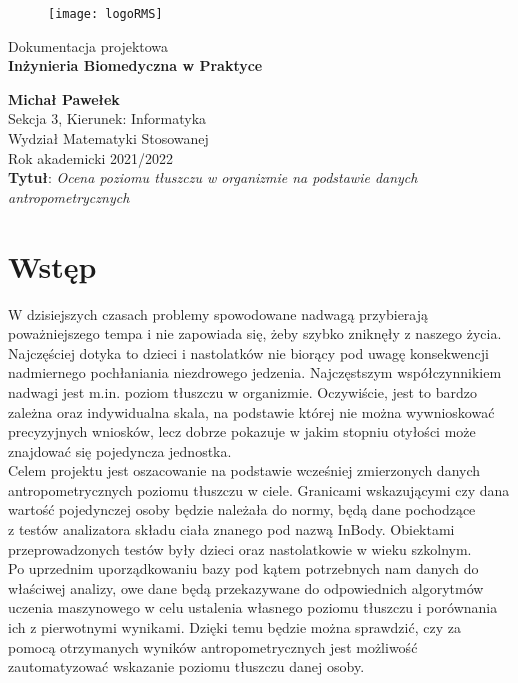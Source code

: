 \documentclass{article}
\begin{document}
\thispagestyle{empty}

\begin{figure}[htbp!]
\centering
\texttt{[image: logoRMS]} \\
\end{figure}
\vspace{1.2cm}

\begin{center}
\Large{Dokumentacja projektowa}\\\vspace{0.5cm} \LARGE{\textbf{Inżynieria Biomedyczna w Praktyce}} 

\vspace{2cm}
{
\large{\textbf{Michał Pawełek}
\\
Sekcja 3, Kierunek: Informatyka \\
Wydział Matematyki Stosowanej \\
Rok akademicki 2021/2022 }\\
\vspace{2.2cm}
\Large{\textbf{Tytuł}: \textit{Ocena poziomu tłuszczu w organizmie na podstawie danych antropometrycznych}}}
\end{center}


\newpage
\setcounter{page}{1}
	\tableofcontents
	\newpage

\section{Wstęp}

W dzisiejszych czasach problemy spowodowane nadwagą przybierają poważniejszego tempa i nie zapowiada się, żeby szybko zniknęły z naszego życia. Najczęściej dotyka to dzieci i nastolatków nie biorący pod uwagę konsekwencji nadmiernego pochłaniania niezdrowego jedzenia. Najczęstszym współczynnikiem nadwagi jest m.in. poziom tłuszczu w organizmie. Oczywiście, jest to bardzo zależna oraz indywidualna skala, na podstawie której nie można wywnioskować precyzyjnych wniosków, lecz dobrze pokazuje w jakim stopniu otyłości może znajdować się pojedyncza jednostka. \\
Celem projektu jest oszacowanie na podstawie wcześniej zmierzonych danych antropometrycznych poziomu tłuszczu w ciele. Granicami wskazującymi czy dana wartość pojedynczej osoby będzie należała do normy, będą dane pochodzące\\z testów analizatora składu ciała znanego pod nazwą InBody. Obiektami przeprowadzonych testów były dzieci oraz nastolatkowie w wieku szkolnym. \\ Po uprzednim uporządkowaniu bazy pod kątem potrzebnych nam danych do właściwej analizy, owe dane będą przekazywane do odpowiednich algorytmów uczenia maszynowego w celu ustalenia własnego poziomu tłuszczu i porównania ich z pierwotnymi wynikami. Dzięki temu będzie można sprawdzić, czy za pomocą otrzymanych wyników antropometrycznych jest możliwość zautomatyzować wskazanie poziomu tłuszczu danej osoby.
\end{document}
